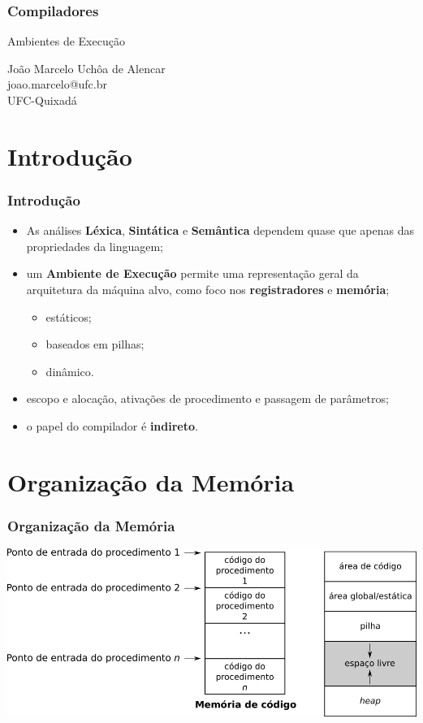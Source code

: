 \documentclass[table]{beamer}
\begin{document}
\begin{frame}
   \frametitle{Compiladores}
   \large
   \begin{center}
   Ambientes de Execução
   \end{center}
   \scriptsize
   \begin{center}
      João Marcelo Uchôa de Alencar \\
      joao.marcelo@ufc.br \\
      UFC-Quixadá
   \end{center}
\end{frame}

\begin{frame}
   \tableofcontents
\end{frame}

\section{Introdução}
\begin{frame}
   \frametitle{Introdução}
   \begin{itemize}
      \item As análises \textbf{Léxica}, \textbf{Sintática} e \textbf{Semântica} dependem quase que apenas das propriedades da linguagem;
      \item um \textbf{Ambiente de Execução} permite uma representação geral da arquitetura da máquina alvo, como foco nos \textbf{registradores} e \textbf{memória}; 
      \begin{itemize}
         \item estáticos;
	 \item baseados em pilhas;
	 \item dinâmico.
      \end{itemize}
      \item escopo e alocação, ativações de procedimento e passagem de parâmetros;
      \item o papel do compilador é \textbf{indireto}.
   \end{itemize}
\end{frame}

\section{Organização da Memória}
\begin{frame}
   \frametitle{Organização da Memória}
   \includegraphics[width=\linewidth,height=\textheight,keepaspectratio]{figuras/organizacaomemoria.png}
\end{frame}
\end{document}

